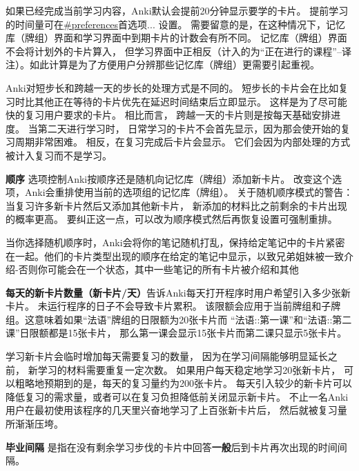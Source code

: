 \documentclass[a4paper]{book}
\begin{document}
	\begin{shaded}
		如果已经完成当前学习内容，Anki默认会提前20分钟显示要学的卡片。 提前学习的时间量可在\url{#preferences}首选项... 设置。 需要留意的是，在这种情况下，记忆库（牌组）界面和学习界面中到期卡片的计数会有所不同。 记忆库（牌组）界面不会将计划外的卡片算入， 但学习界面中正相反（计入的为“正在进行的课程”--译注）。如此计算是为了方便用户分辨那些记忆库（牌组）更需要引起重视。
	\end{shaded}
	
	\begin{shaded}
		Anki对短步长和跨越一天的步长的处理方式是不同的。 短步长的卡片会在比如复习时比其他正在等待的卡片优先在延迟时间结束后立即显示。 这样是为了尽可能快的复习用户要求的卡片。 相比而言， 跨越一天的卡片则是按每天基础安排进度。 当第二天进行学习时， 日常学习的卡片不会首先显示，因为那会使开始的复习周期非常困难。 相反，在复习完成后卡片会显示。 它们会因为内部处理的方式被计入复习而不是学习。
	\end{shaded}
	
	\textbf{顺序} 选项控制Anki按顺序还是随机向记忆库（牌组）添加新卡片。 改变这个选项，Anki会重排使用当前的选项组的记忆库（牌组）。 关于随机顺序模式的警告： 当复习许多新卡片然后又添加其他新卡片， 新添加的材料比之前剩余的卡片出现的概率更高。 要纠正这一点，可以改为顺序模式然后再恢复设置可强制重排。
	
	\begin{shaded}
		当你选择随机顺序时，Anki会将你的笔记随机打乱，保持给定笔记中的卡片紧密在一起。他们的卡片类型出现的顺序在给定的笔记中显示，以致兄弟姐妹被一致介绍-否则你可能会在一个状态，其中一些笔记的所有卡片被介绍和其他
	\end{shaded}
	\textbf{每天的新卡片数量（新卡片/天）}告诉Anki每天打开程序时用户希望引入多少张新卡片。 未运行程序的日子不会导致卡片累积。 该限额会应用于当前牌组和子牌组。这意味着如果“法语”牌组的日限额为20张卡片而 “法语::第一课”和“法语::第二课”日限额都是15张卡片， 那么第一课会显示15张卡片而第二课只显示5张卡片。
	
	\begin{shaded}
		学习新卡片会临时增加每天需要复习的数量， 因为在学习间隔能够明显延长之前， 新学习的材料需要重复一定次数。 如果用户每天稳定地学习20张新卡片， 可以粗略地预期到的是，每天的复习量约为200张卡片。 每天引入较少的新卡片可以降低复习的需求量，或者可以在复习负担降低前关闭显示新卡片。 不止一名Anki用户在最初使用该程序的几天里兴奋地学习了上百张新卡片后， 然后就被复习量所渐渐压垮。
	\end{shaded}
	
	\textbf{毕业间隔} 是指在没有剩余学习步伐的卡片中回答\textbf{一般}后到卡片再次出现的时间间隔。
	
\end{document}
